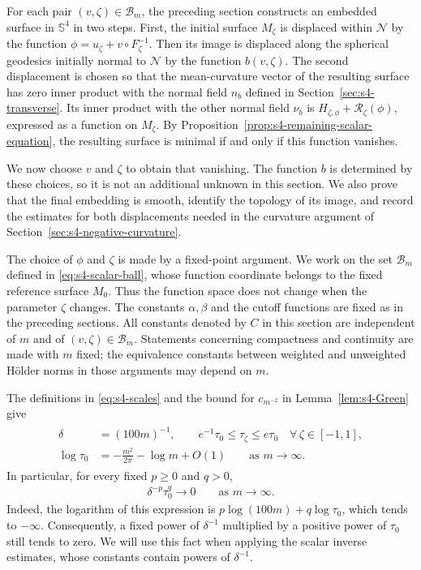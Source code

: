\documentclass[a4paper,11pt,oneside,reqno]{amsart}
\numberwithin{equation}{section}
\theoremstyle{definition}
\begin{document}
For each pair $(v,\zeta)\in\mathcal B_m$, the preceding section
constructs an embedded surface in $\mathbb S^4$ in two steps.
First, the initial surface $M_\zeta$ is displaced within
$\mathcal N$ by the function
$\phi=u_\zeta+v\circ F_\zeta^{-1}$. Then its image is displaced
along the spherical geodesics initially normal to $\mathcal N$
by the function $b(v,\zeta)$. The second displacement is chosen
so that the mean-curvature vector of the resulting surface has
zero inner product with the normal field $n_b$ defined in
Section~\ref{sec:s4-transverse}. Its inner product with the other
normal field $\nu_b$ is
$H_{\zeta,\phi}+\mathcal R_\zeta(\phi)$, expressed as a function
on $M_\zeta$. By Proposition~\ref{prop:s4-remaining-scalar-equation},
the resulting surface is minimal if and only if this function
vanishes.

We now choose $v$ and $\zeta$ to obtain that vanishing. The function
$b$ is determined by these choices, so it is not an additional
unknown in this section. We also prove that the final embedding
is smooth, identify the topology of its image, and record the
estimates for both displacements needed in the curvature argument
of Section~\ref{sec:s4-negative-curvature}.

The choice of $\phi$ and $\zeta$ is made by a fixed-point argument.
We work on the set $\mathcal B_m$ defined in
\eqref{eq:s4-scalar-ball}, whose function coordinate belongs to the
fixed reference surface $M_0$. Thus the function space does not change
when the parameter $\zeta$ changes. The constants $\alpha,\beta$ and
the cutoff functions are fixed as in the preceding sections.
All constants denoted by $C$ in this section are independent of $m$
and of $(v,\zeta)\in\mathcal B_m$. Statements concerning compactness
and continuity are made with $m$ fixed; the equivalence constants
between weighted and unweighted H\"older norms in those arguments
may depend on $m$.

The definitions in \eqref{eq:s4-scales} and the bound for
$c_{m^{-2}}$ in Lemma~\ref{lem:s4-Green} give
%
\begin{align}
    \label{eq:s4-coupled-scale-comparison}
    \begin{split}
        \delta&=(100m)^{-1},\qquad
        e^{-1}\tau_0\leq\tau_\zeta\leq e\tau_0
        \quad\forall\,\zeta\in[-1,1],\\
        \log\tau_0&=-\frac{m^2}{2\pi}-\log m+O(1)
        \qquad\text{as }m\to\infty.
    \end{split}
\end{align}
%
In particular, for every fixed $p\geq0$ and $q>0$,
%
\begin{align*}
    \delta^{-p}\tau_0^q\rightarrow0
    \qquad\mbox{as }m\rightarrow\infty.
\end{align*}
%
Indeed, the logarithm of this expression is
$p\log(100m)+q\log\tau_0$, which tends to $-\infty$.
Consequently, a fixed power of $\delta^{-1}$ multiplied by a
positive power of $\tau_0$ still tends to zero. We will use this
fact when applying the scalar inverse estimates, whose constants
contain powers of $\delta^{-1}$.
\end{document}
